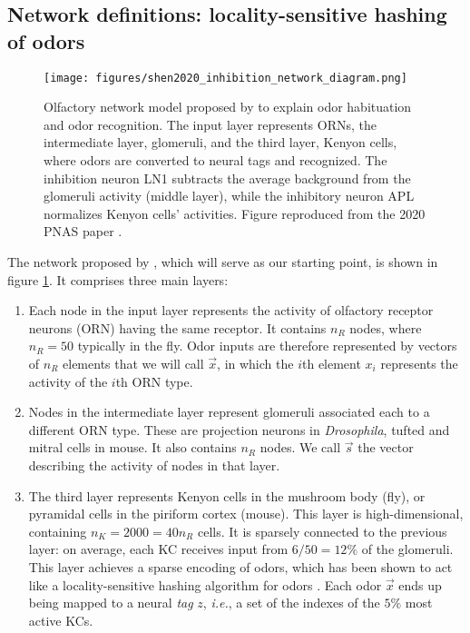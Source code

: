 \subsection{Network definitions: locality-sensitive hashing of odors}
\label{subsect:network_definitions}

\begin{figure}
	\centering
	\texttt{[image: figures/shen2020\_inhibition\_network\_diagram.png]}
	\caption{Olfactory network model proposed by \cite{shen_habituation_2020} to explain odor habituation and odor recognition. The input layer represents ORNs, the intermediate layer, glomeruli, and the third layer, Kenyon cells, where odors are converted to neural tags and recognized. The inhibition neuron LN1 subtracts the average background from the glomeruli activity (middle layer), while the inhibitory neuron APL normalizes Kenyon cells' activities. Figure reproduced from the 2020 PNAS paper \cite{shen_habituation_2020}. }
	\label{fig:basic_network}
\end{figure}

The network proposed by \cite{shen_habituation_2020}, which will serve as our starting point, is shown in figure \ref{fig:basic_network}. It comprises three main layers:

\begin{enumerate}
	\item Each node in the input layer represents the activity of olfactory receptor neurons (ORN) having the same receptor.  It contains $n_R$ nodes, where $n_R=50$ typically in the fly. Odor inputs are therefore represented by vectors of $n_R$ elements that we will call $\vec{x}$, in which the $i$th element $x_i$ represents the activity of the $i$th ORN type.
	\item Nodes in the intermediate layer represent glomeruli associated each to a different ORN type. These are projection neurons in \textit{Drosophila}, tufted and mitral cells in mouse. It also contains $n_R$ nodes. We call $\vec{s}$ the vector describing the activity of nodes in that layer. 
	\item The third layer represents Kenyon cells in the mushroom body (fly), or pyramidal cells in the piriform cortex (mouse). This layer is high-dimensional, containing $n_K = 2000 = 40n_R$ cells. It is sparsely connected to the previous layer: on average, each KC receives input from $6/50 = 12 \%$ of the glomeruli. This layer achieves a sparse encoding of odors, which has been shown to act like a locality-sensitive hashing algorithm for odors \cite{dasgupta_neural_2017}. Each odor $\vec{x}$ ends up being mapped to a neural \emph{tag} $z$, \textit{i.e.}, a set of the indexes of the $5 \%$ most active KCs.  
\end{enumerate}

